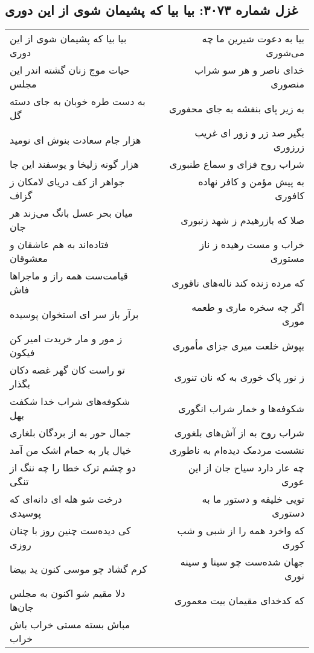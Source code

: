 \begin{center}
\section*{غزل شماره ۳۰۷۳: بیا بیا که پشیمان شوی از این دوری}
\label{sec:3073}
\begin{longtable}{l p{0.5cm} r}
بیا بیا که پشیمان شوی از این دوری
&&
بیا به دعوت شیرین ما چه می‌شوری
\\
حیات موج زنان گشته اندر این مجلس
&&
خدای ناصر و هر سو شراب منصوری
\\
به دست طره خوبان به جای دسته گل
&&
به زیر پای بنفشه به جای محفوری
\\
هزار جام سعادت بنوش ای نومید
&&
بگیر صد زر و زور ای غریب زرزوری
\\
هزار گونه زلیخا و یوسفند این جا
&&
شراب روح فزای و سماع طنبوری
\\
جواهر از کف دریای لامکان ز گزاف
&&
به پیش مؤمن و کافر نهاده کافوری
\\
میان بحر عسل بانگ می‌زند هر جان
&&
صلا که بازرهیدم ز شهد زنبوری
\\
فتاده‌اند به هم عاشقان و معشوقان
&&
خراب و مست رهیده ز ناز مستوری
\\
قیامت‌ست همه راز و ماجراها فاش
&&
که مرده زنده کند ناله‌های ناقوری
\\
برآر باز سر ای استخوان پوسیده
&&
اگر چه سخره ماری و طعمه موری
\\
ز مور و مار خریدت امیر کن فیکون
&&
بپوش خلعت میری جزای مأموری
\\
تو راست کان گهر غصه دکان بگذار
&&
ز نور پاک خوری به که نان تنوری
\\
شکوفه‌های شراب خدا شکفت بهل
&&
شکوفه‌ها و خمار شراب انگوری
\\
جمال حور به از بردگان بلغاری
&&
شراب روح به از آش‌های بلغوری
\\
خیال یار به حمام اشک من آمد
&&
نشست مردمک دیده‌ام به ناطوری
\\
دو چشم ترک خطا را چه ننگ از تنگی
&&
چه عار دارد سیاح جان از این عوری
\\
درخت شو هله ای دانه‌ای که پوسیدی
&&
تویی خلیفه و دستور ما به دستوری
\\
کی دیده‌ست چنین روز با چنان روزی
&&
که واخرد همه را از شبی و شب کوری
\\
کرم گشاد چو موسی کنون ید بیضا
&&
جهان شده‌ست چو سینا و سینه نوری
\\
دلا مقیم شو اکنون به مجلس جان‌ها
&&
که کدخدای مقیمان بیت معموری
\\
مباش بسته مستی خراب باش خراب

\end{longtable}
\end{center}
